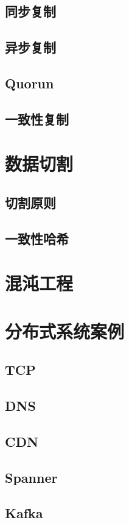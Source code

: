 \documentclass[reqno,heading=true,fontset=macnew]{ctexbook}
\begin{document}
\section{同步复制}

\section{异步复制}

\section{Quorun}

\section{一致性复制}


\chapter{数据切割}
\section{切割原则}

\section{一致性哈希}


\chapter{混沌工程}

\chapter{分布式系统案例}

\section{TCP}
\section{DNS}

\section{CDN}

\section{Spanner}

\section{Kafka}







{}



\printindex
\end{document}
